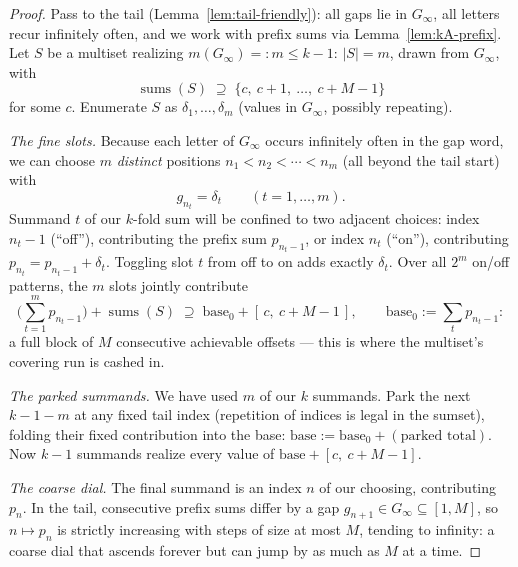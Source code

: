 \documentclass[11pt,reqno]{amsart}
\theoremstyle{plain}
\theoremstyle{definition}
\theoremstyle{remark}
\newcommand{\Ginf}{G_\infty}
\newcommand{\ssum}{\operatorname{sums}}
\begin{document}
\begin{proof}
Pass to the tail (Lemma~\ref{lem:tail-friendly}): all gaps lie in $\Ginf$, all
letters recur infinitely often, and we work with prefix sums via
Lemma~\ref{lem:kA-prefix}. Let $S$ be a multiset realizing $m(\Ginf) =: m \le k-1$:
$|S| = m$, drawn from $\Ginf$, with
\[
  \ssum(S) \;\supseteq\; \{c,\ c+1,\ \dots,\ c + M - 1\}
\]
for some $c$. Enumerate $S$ as $\delta_1, \dots, \delta_m$ (values in $\Ginf$,
possibly repeating).

\emph{The fine slots.} Because each letter of $\Ginf$ occurs infinitely often in
the gap word, we can choose $m$ \emph{distinct} positions $n_1 < n_2 < \cdots <
n_m$ (all beyond the tail start) with
\[
  g_{n_t} = \delta_t \qquad (t = 1, \dots, m) .
\]
Summand $t$ of our $k$-fold sum will be confined to two adjacent choices: index
$n_t - 1$ (``off''), contributing the prefix sum $p_{n_t - 1}$, or index $n_t$
(``on''), contributing $p_{n_t} = p_{n_t - 1} + \delta_t$. Toggling slot $t$ from
off to on adds exactly $\delta_t$. Over all $2^m$ on/off patterns, the $m$ slots
jointly contribute
\[
  \Big( \sum_{t=1}^m p_{n_t - 1} \Big) + \ssum(S)
  \;\supseteq\; \mathrm{base}_0 + [\,c,\ c + M - 1\,],
  \qquad \mathrm{base}_0 := \sum_t p_{n_t - 1} :
\]
a full block of $M$ consecutive achievable offsets --- this is where the multiset's
covering run is cashed in.

\emph{The parked summands.} We have used $m$ of our $k$ summands. Park the next
$k - 1 - m$ at any fixed tail index (repetition of indices is legal in the
sumset), folding their fixed contribution into the base:
$\mathrm{base} := \mathrm{base}_0 + (\text{parked total})$. Now $k - 1$ summands
realize every value of $\mathrm{base} + [c,\ c + M - 1]$.

\emph{The coarse dial.} The final summand is an index $n$ of our choosing,
contributing $p_n$. In the tail, consecutive prefix sums differ by a gap
$g_{n+1} \in \Ginf \subseteq [1, M]$, so $n \mapsto p_n$ is strictly increasing
with steps of size at most $M$, tending to infinity: a coarse dial that ascends
forever but can jump by as much as $M$ at a time.


\end{proof}
\end{document}

